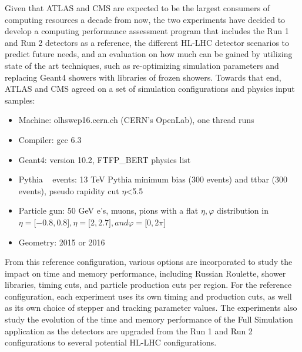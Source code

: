 \documentclass[12pt,a4paper]{article}
\begin{document}
{Given that ATLAS and CMS are expected to be the largest consumers of
computing resources a decade from now, the two experiments have decided
to develop a computing performance assessment program that includes the
Run 1 and Run 2 detectors as a reference, the different HL-LHC detector
scenarios to predict future needs, and an evaluation on how much can be
gained by utilizing state of the art techniques, such as re-optimizing
simulation parameters and replacing Geant4 showers with libraries of
frozen showers. Towards that end, ATLAS and CMS agreed on a set of
simulation configurations and physics input samples:

\begin{itemize}
\item
  Machine: olhswep16.cern.ch (CERN's OpenLab), one thread runs
\item
  Compiler: gcc 6.3
\item
  Geant4: version 10.2, FTFP\_BERT physics list
\item
  Pythia ~\cite{Sjostrand:2014zea} events: 13 TeV Pythia minimum bias (300 events) and
  ttbar (300 events), pseudo rapidity cut \textbar{}$\eta$\textbar{}\textless{}5.5
\item
  Particle gun: 50 GeV e's, muons, pions with a flat $\eta,\varphi$ distribution in
  $\eta={[}-0.8,0.8{]}, \eta={[}2,2.7{]}, and \varphi= {[}0,2\pi{]}$
\item
  Geometry: 2015 or 2016
\end{itemize}

From this reference configuration, various options are incorporated to
study the impact on time and memory performance, including Russian
Roulette, shower libraries, timing cuts, and particle production cuts
per region. For the reference configuration, each experiment uses its
own timing and production cuts, as well as its own choice of stepper and
tracking parameter values. The experiments also study the evolution of
the time and memory performance of the Full Simulation application as
the detectors are upgraded from the Run 1 and Run 2 configurations to
several potential HL-LHC configurations.

}
\end{document}
